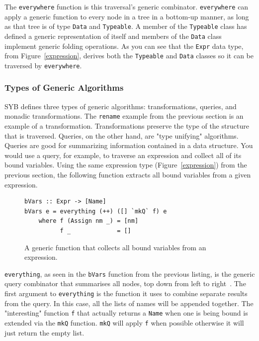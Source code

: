 	The \texttt{everywhere} function is this traversal's generic combinator. \texttt{everywhere} can apply a generic function to every node in a tree in a bottom-up manner, as long as that tree is of type \texttt{Data} and \texttt{Typeable}. A member of the \texttt{Typeable} class has defined a generic representation of itself and members of the \texttt{Data} class implement generic folding operations.	As you can see that the \texttt{Expr} data type, from Figure~\ref{expression}, derives both the \texttt{Typeable} and \texttt{Data} classes so it can be traversed by \texttt{everywhere}.  
	
\subsubsection{Types of Generic Algorithms}

SYB defines three types of generic algorithms: transformations, queries, and monadic transformations. The \texttt{rename} example from the previous section is an example of a transformation. Transformations preserve the type of the structure that is traversed. Queries, on the other hand, are "type unifying" algorithms. Queries are good for summarizing information contained in a data structure. You would use a query, for example, to traverse an expression and collect all of its bound variables. Using the same expression type (Figure~\ref{expression}) from the previous section, the following function extracts all bound variables from a given expression.

\begin{figure}[t]
\begin{lstlisting}
bVars :: Expr -> [Name]
bVars e = everything (++) ([] `mkQ` f) e
	where f (Assign nm _) = [nm]
          f _             = []
\end{lstlisting}
\caption{A generic function that collects all bound variables from an expression.}
\end{figure}

\texttt{everything}, as seen in the \texttt{bVars} function from the previous listing, is the generic query combinator that summarises all nodes, top down from left to right~\citep{sybDocs}. The first argument to \texttt{everything} is the function it uses to combine separate results from the query. In this case, all the lists of names will be appended together. The "interesting" function \texttt{f} that actually returns a \texttt{Name} when one is being bound is extended via the \texttt{mkQ} function. \texttt{mkQ} will apply \texttt{f} when possible otherwise it will just return the empty list.

